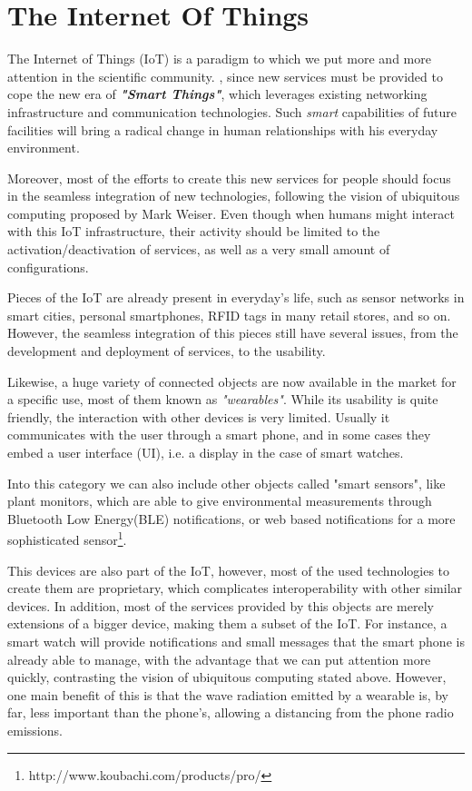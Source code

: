 \chapter{The Internet Of Things}
\label{sec:IoT}
The Internet of Things (IoT) is a paradigm to which we put more and more attention in the scientific community\cite{atzori2010iotsurvey}.
, since new services must be provided to cope the new era of \textit{\textbf{"Smart Things"}}, which leverages existing networking infrastructure and communication technologies.
Such \textit{smart} capabilities of future facilities will bring a radical change in human relationships with his everyday environment.

Moreover, most of the efforts to create this new services for people should focus in the seamless integration of new technologies, following the vision of ubiquitous computing proposed by Mark Weiser\cite{weiser1999ubiquitous}.
Even though when humans might interact with this IoT infrastructure, their activity should be limited to the activation/deactivation of services, as well as a very small amount of configurations.

Pieces of the IoT are already present in everyday's life, such as sensor networks in smart cities, personal smartphones, RFID tags in many retail stores, and so on.
However, the seamless integration of this pieces still have several issues, from the development and deployment of services, to the usability.

Likewise, a huge variety of connected objects are now available in the market for a specific use, most of them known as \textit{"wearables"}.
While its usability is quite friendly, the interaction with other devices is very limited.
Usually it communicates with the user through a smart phone, and in some cases they embed a user interface (UI), i.e. a display in the case of smart watches.

Into this category we can also include other objects called "smart sensors", like plant monitors\cite{bolliger2007koubachi}, which are able to give environmental measurements through Bluetooth Low Energy(BLE) notifications, or web based notifications for a more sophisticated sensor\footnote{http://www.koubachi.com/products/pro/}.

This devices are also part of the IoT\cite{wei2014wearables}, however, most of the used technologies to create them are proprietary, which complicates interoperability with other similar devices.
In addition, most of the services provided by this objects are merely extensions of a bigger device, making them a subset of the IoT.
For instance, a smart watch will provide notifications and small messages that the smart phone is already able to manage, with the advantage that we can put attention more quickly, contrasting the vision of ubiquitous computing stated above.
However, one main benefit of this is that the wave radiation emitted by a wearable is, by far, less important than the phone's, allowing a distancing from the phone radio emissions.

